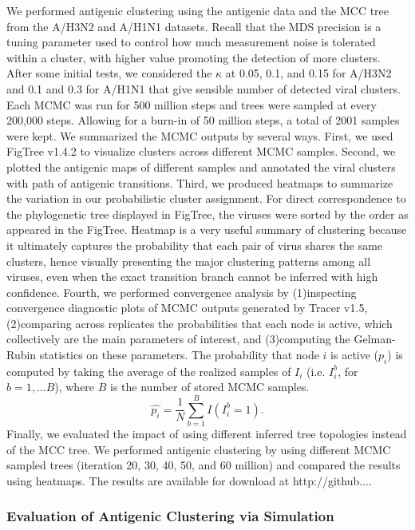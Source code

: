 \documentclass[11pt,oneside,letterpaper]{article}
\begin{document}
We performed antigenic clustering using the antigenic data and the MCC tree from the A/H3N2 and A/H1N1 datasets. 
Recall that the MDS precision is a tuning parameter used to control how much measurement noise is tolerated within a cluster, with higher value promoting the detection of more clusters. 
After some initial tests, we considered the $\kappa$ at 0.05, 0.1, and 0.15 for A/H3N2 and 0.1 and 0.3 for A/H1N1 that give sensible number of detected viral clusters.  
Each MCMC was run for 500 million steps and trees were sampled at every 200,000 steps. 
Allowing for a burn-in of 50 million steps, a total of 2001 samples were kept.
We summarized the MCMC outputs by several ways. 
First, we used FigTree v1.4.2 to visualize clusters across different  MCMC samples. 
Second, we plotted the antigenic maps of different samples and annotated the viral clusters with path of antigenic transitions. 
Third, we produced heatmaps to summarize the variation in our probabilistic cluster assignment. 
For direct correspondence to the phylogenetic tree displayed in FigTree, the viruses were sorted by the order as appeared in the FigTree.
Heatmap is a very useful summary of clustering because it ultimately captures the probability that each pair of virus shares the same clusters, hence visually presenting the major clustering patterns among all viruses, even when the exact transition branch cannot be inferred with high confidence. %
Fourth, we performed convergence analysis by (1)inspecting convergence diagnostic plots of MCMC outputs generated by Tracer v1.5, (2)comparing across replicates the probabilities that each node is active, which collectively are the main parameters of interest, and (3)computing the Gelman-Rubin statistics on these parameters. 
The probability that node $i$ is active ($p_i$) is computed by taking the average of the realized samples of $I_i$ (i.e. $I_i^b$, for $b=1,...B$), where $B$ is the number of stored MCMC samples.
\begin{equation}
 \hat{p_i} = \frac{1}{N} \sum_{b=1}^{B} I(I_i^b  = 1).
\end{equation}
Finally, we evaluated the impact of using different inferred tree topologies instead of the MCC tree. 
We performed antigenic clustering by using different MCMC sampled trees (iteration 20, 30, 40, 50, and 60 million) and compared the results using heatmaps.
The results are available for download at http://github....


\subsubsection*{Evaluation of Antigenic Clustering via Simulation}
\end{document}
